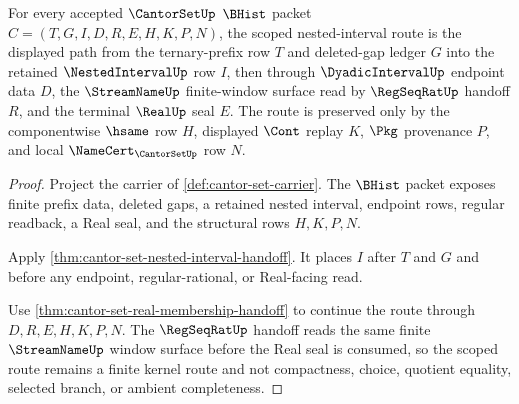 \begin{theorem}
\label{thm:cantorset-scoped-nested-interval-route}
For every accepted $\CantorSetUp$ $\BHist$ packet $C=(T,G,I,D,R,E,H,K,P,N)$, the scoped nested-interval route is the displayed path from the ternary-prefix row $T$ and deleted-gap ledger $G$ into the retained $\NestedIntervalUp$ row $I$, then through $\DyadicIntervalUp$ endpoint data $D$, the $\StreamNameUp$ finite-window surface read by $\RegSeqRatUp$ handoff $R$, and the terminal $\RealUp$ seal $E$. The route is preserved only by the componentwise $\hsame$ row $H$, displayed $\Cont$ replay $K$, $\Pkg$ provenance $P$, and local $\NameCert_{\CantorSetUp}$ row $N$.
\end{theorem}
\begin{proof}
Project the carrier of \autoref{def:cantor-set-carrier}. The $\BHist$ packet exposes finite prefix data, deleted gaps, a retained nested interval, endpoint rows, regular readback, a Real seal, and the structural rows $H,K,P,N$.

Apply \autoref{thm:cantor-set-nested-interval-handoff}. It places $I$ after $T$ and $G$ and before any endpoint, regular-rational, or Real-facing read.

Use \autoref{thm:cantor-set-real-membership-handoff} to continue the route through $D,R,E,H,K,P,N$. The $\RegSeqRatUp$ handoff reads the same finite $\StreamNameUp$ window surface before the Real seal is consumed, so the scoped route remains a finite kernel route and not compactness, choice, quotient equality, selected branch, or ambient completeness.
\end{proof}

